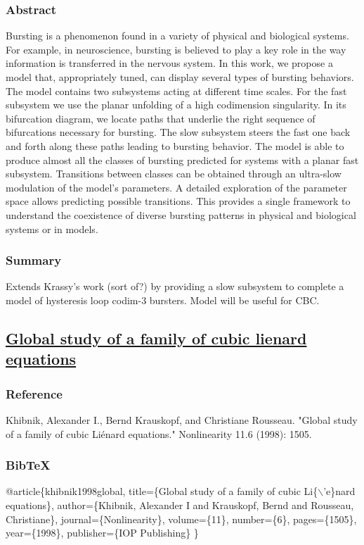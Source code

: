 \documentclass[11pt]{article}
\begin{document}
\subsubsection{Abstract}
\label{sec:orgbdce4ec}
Bursting is a phenomenon found in a variety of physical and biological
systems. For example, in neuroscience, bursting is believed to play a
key role in the way information is transferred in the nervous system.
In this work, we propose a model that, appropriately tuned, can
display several types of bursting behaviors. The model contains two
subsystems acting at different time scales. For the fast subsystem we
use the planar unfolding of a high codimension singularity. In its
bifurcation diagram, we locate paths that underlie the right sequence
of bifurcations necessary for bursting. The slow subsystem steers the
fast one back and forth along these paths leading to bursting
behavior. The model is able to produce almost all the classes of
bursting predicted for systems with a planar fast subsystem.
Transitions between classes can be obtained through an ultra-slow
modulation of the model’s parameters. A detailed exploration of the
parameter space allows predicting possible transitions. This provides
a single framework to understand the coexistence of diverse bursting
patterns in physical and biological systems or in models.

\subsubsection{Summary}
\label{sec:org891446c}
Extends Krassy's work (sort of?) by providing a slow subsystem to complete a model of hysteresis loop codim-3 bursters.
Model will be useful for CBC.

\subsection{\href{https://scholar.google.com/scholar?hl=en\&as\_sdt=0\%2C5\&q=global+study+of+a+family+of+cubic+lienard+equations\&btnG=}{Global study of a family of cubic lienard equations}}
\label{sec:orgd3ebf51}
\subsubsection{Reference}
\label{sec:orgc7dedc9}
Khibnik, Alexander I., Bernd Krauskopf, and Christiane Rousseau. "Global study of a family of cubic Liénard equations." Nonlinearity 11.6 (1998): 1505.

\subsubsection{BibTeX}
\label{sec:orga32a4ca}
@article\{khibnik1998global,
  title=\{Global study of a family of cubic Li\{$\backslash$'e\}nard equations\},
  author=\{Khibnik, Alexander I and Krauskopf, Bernd and Rousseau, Christiane\},
  journal=\{Nonlinearity\},
  volume=\{11\},
  number=\{6\},
  pages=\{1505\},
  year=\{1998\},
  publisher=\{IOP Publishing\}
\}
\end{document}
